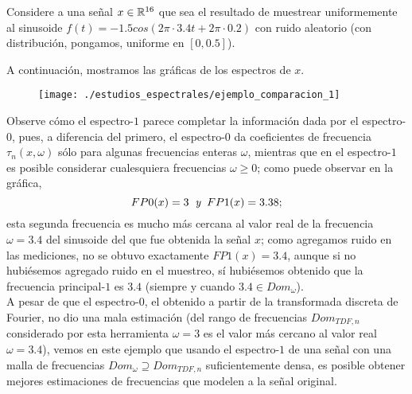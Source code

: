 \begin{ejemplo}
\label{ej: espectros comparacion}
Considere a una señal $x \in \mathbb{R}^{16}$ que sea el resultado
de muestrear uniformemente al sinusoide
$f(t) = -1.5 cos (2 \pi \cdot 3.4 t + 2 \pi \cdot 0.2)$
con ruido aleatorio (con distribución, pongamos, uniforme en $[0,0.5]$).

A continuación, mostramos las gráficas
de los espectros de $x$.


\begin{figure}[H]
\centering
    \texttt{[image: ./estudios\_espectrales/ejemplo\_comparacion\_1]}
\end{figure}


Observe cómo el espectro-$1$ parece completar la información
dada por el espectro-$0$, pues, a diferencia del primero,
el espectro-$0$
da coeficientes de frecuencia $\tau_{n}(x, \omega)$ sólo
para algunas frecuencias enteras $\omega$, mientras que en el espectro-$1$
es posible considerar cualesquiera frecuencias $\omega \geq 0$; como puede observar
en la gráfica, 
\[
FP0 (x) = 3 \hspace{0.2cm} \textit{y} \hspace{0.2cm}
FP1 (x) = 3.38;
\]
esta segunda frecuencia es mucho más cercana al valor
real de la frecuencia $\omega =3.4$ del sinusoide del que
fue obtenida la señal $x$; como agregamos ruido en las mediciones, no se
obtuvo exactamente $FP1(x) = 3.4$, aunque si no
hubiésemos agregado ruido en el muestreo, sí hubiésemos obtenido
que la frecuencia principal-$1$ es $3.4$ (siempre y cuando
$3.4 \in Dom_{\omega}$). \\

A pesar de que el espectro-$0$, el obtenido a partir de la
transformada discreta de Fourier, no dio una mala estimación (del rango
de frecuencias $Dom_{TDF,n}$ considerado por esta herramienta
$\omega =3$ es el valor más cercano al valor real $\omega = 3.4$), vemos en este
ejemplo que usando el espectro-$1$ de una señal con una malla de
frecuencias $Dom_{\omega} \supseteq Dom_{TDF,n}$
suficientemente densa, es posible obtener mejores
estimaciones de frecuencias que modelen a la señal original. \\


\end{ejemplo}
